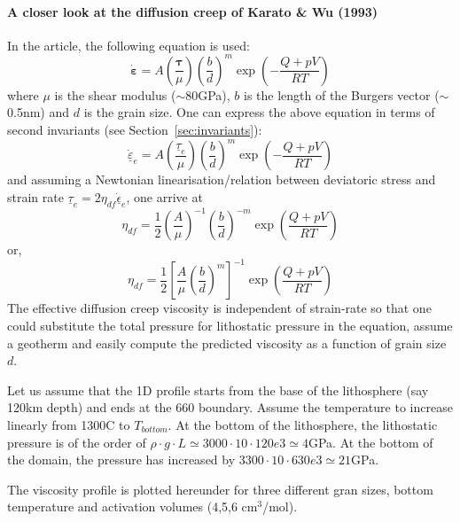 \paragraph{A closer look at the diffusion creep of Karato \& Wu (1993)} In the article, the following equation 
is used: 
\[
\dot{\bm \varepsilon} = A \left(\frac{{\bm \tau}}{\mu}\right) \left(\frac{b}{d}\right)^m \exp \left( -\frac{Q+pV}{RT}\right)
\]
where $\mu$ is the shear modulus ($\sim$80GPa), $b$ is the length of the Burgers vector ($\sim$0.5nm) and 
$d$ is the grain size.
One can express the above equation in terms of second invariants (see Section~\ref{sec:invariants}):
\[
\underline{\dot{\varepsilon}}_{e} 
= A \left(\frac{\underline{\tau}_{e}}{\mu}\right) \left(\frac{b}{d}\right)^m \exp\left( -\frac{Q+pV}{RT} \right)
\]
and assuming a Newtonian linearisation/relation between deviatoric stress 
and strain rate  $\underline{\tau}_{e} = 2 \eta_{df} \underline{\dot\epsilon}_{e}$, one arrive at
\[
\eta_{df} = \frac{1}{2} \left(\frac{A}{\mu}\right)^{-1}  \left(\frac{b}{d}\right)^{-m} \exp\left( \frac{Q+pV}{RT} \right)
\]
or, 
\[
\eta_{df} = \frac{1}{2} \left[ \frac{A}{\mu}   \left(\frac{b}{d}\right)^{m} \right]^{-1} \exp\left( \frac{Q+pV}{RT} \right)
\]
The effective diffusion creep viscosity is independent of strain-rate so that one 
could substitute the total pressure for lithostatic pressure in the equation, assume 
a geotherm and easily compute the predicted viscosity as a function of grain size $d$.

Let us assume that the 1D profile starts from the base of the lithosphere 
(say 120km depth) and ends at the 660 boundary. 
Assume the temperature to increase linearly from 1300\degree C to $T_{bottom}$. At the bottom 
of the lithosphere, the lithostatic pressure is of the order of 
$\rho \cdot g \cdot L \simeq 3000\cdot 10 \cdot 120e3 \simeq 4$GPa. 
At the bottom of the domain, the pressure has increased by $3300\cdot 10 \cdot 630e3 \simeq21$GPa. 

The viscosity profile is plotted hereunder for three different gran sizes, bottom temperature and 
activation volumes (4,5,6 cm$^3$/mol). 

